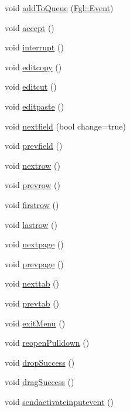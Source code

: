 \begin{DoxyCompactItemize}
\item 
void \hyperlink{classFglForm_a82a066a47d5d8bc2f7c2ec41ab29d4f2}{addToQueue} (\hyperlink{structFgl_1_1Event}{Fgl::Event})
\item 
void \hyperlink{classFglForm_a2300cda82ffb223096c19f63004e248f}{accept} ()
\item 
void \hyperlink{classFglForm_a0e2bda025291fc5a29a74254418cffdb}{interrupt} ()
\item 
void \hyperlink{classFglForm_ac51ab1764a0c88802875af3b0ef890af}{editcopy} ()
\item 
void \hyperlink{classFglForm_acba6e2dba68f2d8c8354a1f3e7de0213}{editcut} ()
\item 
void \hyperlink{classFglForm_a3bbc33d5de6401f21553a0e09e091292}{editpaste} ()
\item 
void \hyperlink{classFglForm_a1a279ed4bf3d729f30a346e8e6c9b8c7}{nextfield} (bool change=true)
\item 
void \hyperlink{classFglForm_a1a8413bf151ffd1e9fb4b0ae2a78dd6e}{prevfield} ()
\item 
void \hyperlink{classFglForm_a0321ef0bb745923607aecc90ff23dc16}{nextrow} ()
\item 
void \hyperlink{classFglForm_a92a335499ab7c95fa5b106f7a9f21e33}{prevrow} ()
\item 
void \hyperlink{classFglForm_af18f12d697d5a9fa0041c597d692d8f1}{firstrow} ()
\item 
void \hyperlink{classFglForm_adbc1aae701b9f9be093df1b60072ed10}{lastrow} ()
\item 
void \hyperlink{classFglForm_aafc9f7cacb9852d58b809a840abc104e}{nextpage} ()
\item 
void \hyperlink{classFglForm_ac3cf8e2f5bfc433cb19497e6bad4db0d}{prevpage} ()
\item 
void \hyperlink{classFglForm_a3f1ae54d6ef1585a6f14cf394758c09b}{nexttab} ()
\item 
void \hyperlink{classFglForm_a9eefd50c2b2dbcd9303a20a02a2ad140}{prevtab} ()
\item 
void \hyperlink{classFglForm_ac9689ad22eff52db3ab60446b78274e3}{exitMenu} ()
\item 
void \hyperlink{classFglForm_a267469fbb08f5d257f162df03b88852a}{reopenPulldown} ()
\item 
void \hyperlink{classFglForm_a0ccb7e3f717496c6dceaf34b0a6d49df}{dropSuccess} ()
\item 
void \hyperlink{classFglForm_a2a05aab413be356d8591d9feaa3818ea}{dragSuccess} ()
\item 
void \hyperlink{classFglForm_a6c13e4f1841a38f5cbf615595f88f78f}{sendactivateinputevent} ()

\end{DoxyCompactItemize}
